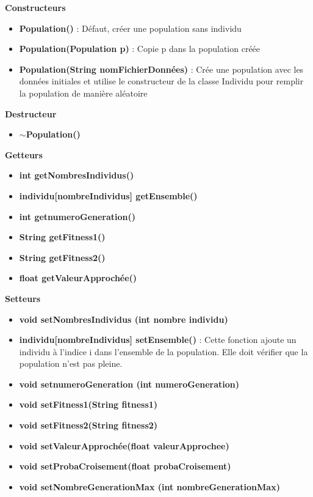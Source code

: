 \documentclass[a4paper,11pt]{article}
\begin{document}
			\textbf{Constructeurs}
						\begin{itemize}
							\item \textbf{Population()} : Défaut, créer une population sans individu
							\item \textbf{Population(Population p)} : Copie p dans la population créée
							\item \textbf{Population(String nomFichierDonnées)} : Crée une population avec les données initiales et utilise le constructeur de la classe Individu pour remplir la population de manière aléatoire\\
						\end{itemize}
			\textbf{Destructeur}
					\begin{itemize}
							\item \textbf{$\sim$Population()}\\
					\end{itemize}
			\textbf{Getteurs}
					\begin{itemize}
							\item \textbf{int getNombresIndividus()}
							\item \textbf{individu[nombreIndividus] getEnsemble()}
							\item \textbf{int getnumeroGeneration()}
							\item \textbf{String getFitness1()}
							\item \textbf{String getFitness2()}
							\item \textbf{float getValeurApprochée()}\\
					\end{itemize}
			\textbf{Setteurs}
					\begin{itemize}
							\item \textbf{void setNombresIndividus (int nombre individu)}
							\item \textbf{individu[nombreIndividus] setEnsemble()} : Cette fonction ajoute un individu à l’indice i dans l’ensemble de la population.
																			Elle doit vérifier que la population n’est pas pleine.
							\item \textbf{void setnumeroGeneration (int numeroGeneration)}
							\item \textbf{void setFitness1(String fitness1)}
							\item \textbf{void setFitness2(String fitness2)}
							\item \textbf{void setValeurApprochée(float valeurApprochee)}
							\item \textbf{void setProbaCroisement(float probaCroisement)}
							\item \textbf{void setNombreGenerationMax (int nombreGenerationMax)}\\
					\end{itemize}
\end{document}
